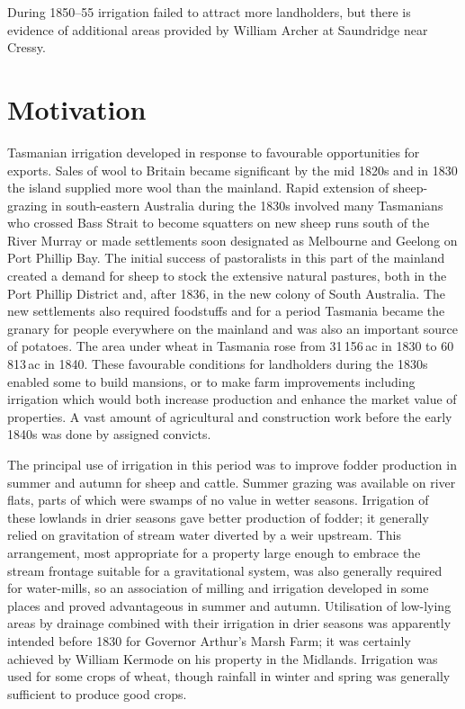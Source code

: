During 1850--55 irrigation failed to attract more landholders, but
there is evidence of additional areas provided by William Archer at
Saundridge near Cressy.

\section*{Motivation}

Tasmanian irrigation developed in response to favourable opportunities
for exports.  Sales of wool to Britain became significant by the mid
1820s and in 1830 the island supplied more wool than the mainland.
Rapid extension of sheep-grazing in south-eastern Australia during the
1830s involved many Tasmanians who crossed Bass Strait to become
squatters on new sheep runs south of the River Murray or made
settlements soon designated as Melbourne and Geelong on Port Phillip
Bay.  The initial success of pastoralists in this part of the mainland
created a demand for sheep to stock the extensive natural pastures,
both in the Port Phillip District and, after 1836, in the new colony
of South Australia.  The new settlements also required foodstuffs and
for a period Tasmania became the granary for people everywhere on the
mainland and was also an important source of
potatoes.  The area under wheat in Tasmania rose from 31\,156\,ac in
1830 to 60\,813\,ac in 1840.  These favourable
conditions for landholders during the 1830s enabled some to build
mansions, or to make farm improvements including irrigation which
would both increase production and enhance the market value of
properties.  A vast amount of agricultural and construction work
before the early 1840s was done by assigned
convicts.

The principal use of irrigation in this period was to improve fodder
production in summer and autumn for sheep and cattle. Summer grazing
was available on river flats, parts of which were swamps of no value
in wetter seasons.  Irrigation of these lowlands in drier seasons gave
better production of fodder; it generally relied on gravitation of
stream water diverted by a weir upstream.  This arrangement, most
appropriate for a property large enough to embrace the stream frontage
suitable for a gravitational system, was also generally required for
water-mills, so an association of milling and irrigation developed in
some places and proved advantageous in summer and autumn.  Utilisation
of low-lying areas by drainage combined with their irrigation in drier
seasons was apparently intended before 1830 for Governor Arthur's
Marsh Farm; it was certainly achieved by William Kermode on his
property in the Midlands.  Irrigation was used for some crops of
wheat, though rainfall in winter and spring was generally sufficient
to produce good crops.

